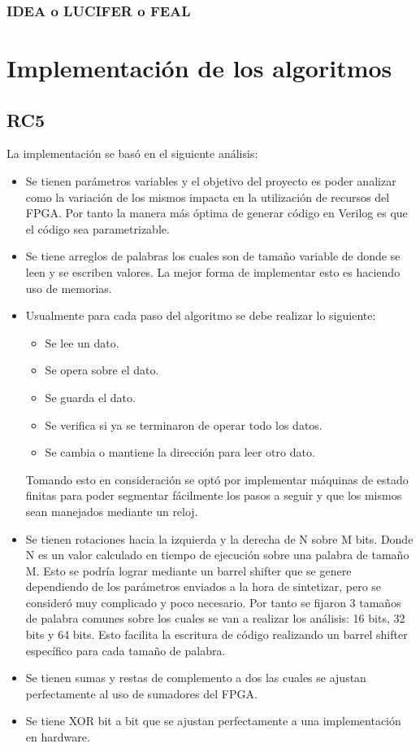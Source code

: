\subsection{IDEA o LUCIFER o FEAL}




\chapter{Implementación de los algoritmos}

\section{RC5}
La implementación se basó en el siguiente análisis:
\begin{itemize}
\item Se tienen parámetros variables y el objetivo del proyecto es poder analizar como la variación de los mismos impacta en la utilización de recursos del FPGA. Por tanto la manera más óptima de generar código en Verilog es que el código sea parametrizable.

\item Se tiene arreglos de palabras los cuales son de tamaño variable de donde se leen y se escriben valores. La mejor forma de implementar esto es haciendo uso de memorias.

\item Usualmente para cada paso del algoritmo se debe realizar lo siguiente:
\begin{itemize}
\item Se lee un dato.
\item Se opera sobre el dato.
\item Se guarda el dato.
\item Se verifica si ya se terminaron de operar todo los datos.
\item Se cambia o mantiene la dirección para leer otro dato.
\end{itemize}
Tomando esto en consideración se optó por implementar máquinas de estado finitas para poder segmentar fácilmente los pasos a seguir y que los mismos sean manejados mediante un reloj.

\item Se tienen rotaciones hacia la izquierda y la derecha de N sobre M bits. Donde N es un valor calculado en tiempo de ejecución sobre una palabra de tamaño M. Esto se podría lograr mediante un barrel shifter que se genere dependiendo de los parámetros enviados a la hora de sintetizar, pero se consideró muy complicado y poco necesario. Por tanto se fijaron 3 tamaños de palabra comunes sobre los cuales se van a realizar los análisis: 16 bits, 32 bits y 64 bits. Esto facilita la escritura de código realizando un barrel shifter específico para cada tamaño de palabra. 

\item Se tienen sumas y restas de complemento a dos las cuales se ajustan perfectamente al uso de sumadores del FPGA.

\item Se tiene XOR bit a bit que se ajustan perfectamente a una implementación en hardware.
\end{itemize}


